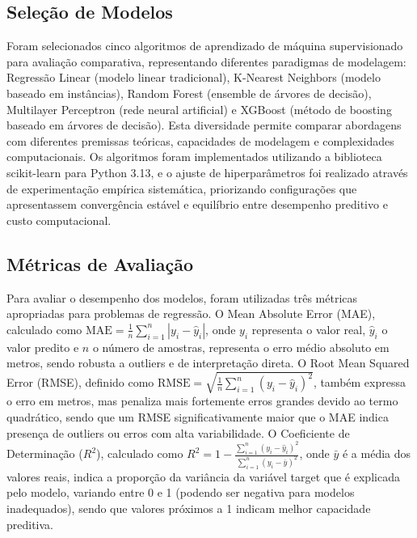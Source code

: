 \documentclass[conference]{IEEEtran}
\begin{document}
\subsection{Seleção de Modelos}
Foram selecionados cinco algoritmos de aprendizado de máquina supervisionado para avaliação comparativa, representando diferentes paradigmas de modelagem: Regressão Linear (modelo linear tradicional), K-Nearest Neighbors (modelo baseado em instâncias), Random Forest (ensemble de árvores de decisão), Multilayer Perceptron (rede neural artificial) e XGBoost (método de boosting baseado em árvores de decisão). Esta diversidade permite comparar abordagens com diferentes premissas teóricas, capacidades de modelagem e complexidades computacionais. Os algoritmos foram implementados utilizando a biblioteca scikit-learn para Python 3.13, e o ajuste de hiperparâmetros foi realizado através de experimentação empírica sistemática, priorizando configurações que apresentassem convergência estável e equilíbrio entre desempenho preditivo e custo computacional.

\subsection{Métricas de Avaliação}
Para avaliar o desempenho dos modelos, foram utilizadas três métricas apropriadas para problemas de regressão. O Mean Absolute Error (MAE), calculado como $\text{MAE} = \frac{1}{n} \sum_{i=1}^{n} |y_i - \hat{y}_i|$, onde $y_i$ representa o valor real, $\hat{y}_i$ o valor predito e $n$ o número de amostras, representa o erro médio absoluto em metros, sendo robusta a outliers e de interpretação direta. O Root Mean Squared Error (RMSE), definido como $\text{RMSE} = \sqrt{\frac{1}{n} \sum_{i=1}^{n} (y_i - \hat{y}_i)^2}$, também expressa o erro em metros, mas penaliza mais fortemente erros grandes devido ao termo quadrático, sendo que um RMSE significativamente maior que o MAE indica presença de outliers ou erros com alta variabilidade. O Coeficiente de Determinação ($R^2$), calculado como $R^2 = 1 - \frac{\sum_{i=1}^{n} (y_i - \hat{y}_i)^2}{\sum_{i=1}^{n} (y_i - \bar{y})^2}$, onde $\bar{y}$ é a média dos valores reais, indica a proporção da variância da variável target que é explicada pelo modelo, variando entre 0 e 1 (podendo ser negativa para modelos inadequados), sendo que valores próximos a 1 indicam melhor capacidade preditiva.
\end{document}

